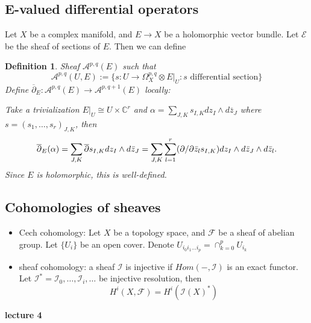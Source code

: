 \documentclass{article}
\newtheorem{definition}{Definition}[subsection]
\begin{document}
\subsection{E-valued differential operators}
Let $X$ be a complex manifold, and $E\to X$ be a holomorphic vector bundle. Let $\mathcal{E}$ be the sheaf of sections of $E$. Then we can define
\begin{definition}
  Sheaf $\mathcal{A}^{p,q}(E)$ such that
  \[
    \mathcal{A}^{p,q}(U,E):= \{s: U \to \Omega^{p,q}_{X}\otimes E|_{U}: s \text{ differential section}\} 
  \]
  Define $ \overline{\partial}_{E}:\mathcal{A}^{p,q}(E) \to \mathcal{A}^{p,q+1}(E)$ locally:

  Take a trivialization $E|_{U}\cong U \times \mathbb{C}^{r}$ and $\alpha= \sum_{J,K}s_{I,K}dz_{I}\wedge d \bar{z}_{J}$ where $s=(s_{1},\ldots ,s_{r})_{J,K}$, then
  \[
    \overline{\partial}_{E}(\alpha)= \sum_{J,K} \overline{\partial}s_{I,K}dz_{I}\wedge d\bar{z}_{J}\\
    = \sum_{J,K} \sum_{l=1}^{r} (\partial/\partial \bar{z}_{l}s_{I,K})dz_{I}\wedge d\bar{z}_{J} \wedge d \bar{z}_{l}.
  \]
 Since $E$ is holomorphic, this is well-defined.
\end{definition}
\subsection{Cohomologies of sheaves}
\begin{itemize}
  \item Cech cohomology: Let $X$ be a topology space, and $\mathcal{F}$ be a sheaf of abelian group. Let $\{U_{i}\} $ be an open cover. Denote $U_{i_{0}i_{1}\ldots i_{p}}= \cap_{k=0}^{p} U_{i_{k}}$  
  \item sheaf cohomology: a sheaf $\mathcal{I}$ is injective if $Hom(-,\mathcal{I})$ is an exact functor. Let $\mathcal{I}^{*}=\mathcal{I}_{0},\ldots ,\mathcal{I}_{i},\ldots $ be injective resolution, then
    \[
      H^{i}(X,\mathcal{F})=H^{i}(\mathcal{I}(X)^{*})
    \]
\end{itemize}

\textbf{lecture 4}
\end{document}
